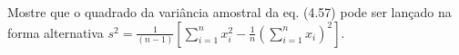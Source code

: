 Mostre que o quadrado da variância amostral da eq. (4.57) pode ser lançado na forma alternativa $s^2 = \frac{1}{(n-1)} \left[ \sum_{i=1}^n x_i^2 - \frac{1}{n} \left(\sum_{i=1}^n x_i\right)^2 \right]$.

